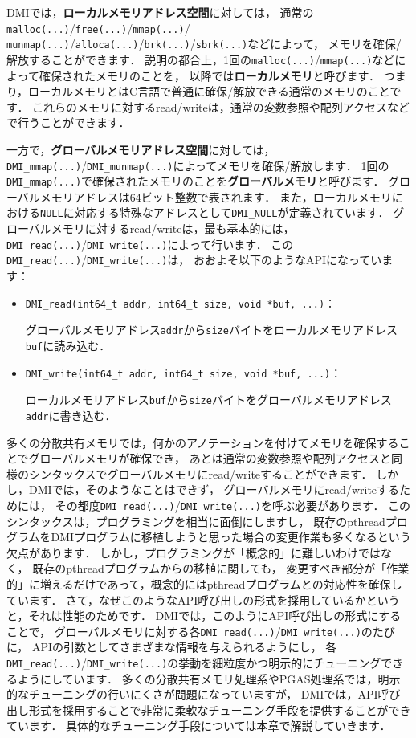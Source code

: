 \documentclass[report,12pt]{jsbook}
\begin{document}
DMIでは，\textbf{ローカルメモリアドレス空間}に対しては，
通常の\texttt{malloc(...)}/\texttt{free(...)}/\texttt{mmap(...)}/
\texttt{munmap(...)}/\texttt{alloca(...)}/\texttt{brk(...)}/\texttt{sbrk(...)}などによって，
メモリを確保/解放することができます．
説明の都合上，1回の\texttt{malloc(...)}/\texttt{mmap(...)}などによって確保されたメモリのことを，
以降では\textbf{ローカルメモリ}と呼びます．
つまり，ローカルメモリとはC言語で普通に確保/解放できる通常のメモリのことです．
これらのメモリに対するread/writeは，通常の変数参照や配列アクセスなどで行うことができます．

一方で，\textbf{グローバルメモリアドレス空間}に対しては，
\texttt{DMI\_mmap(...)}/\texttt{DMI\_munmap(...)}によってメモリを確保/解放します．
1回の\texttt{DMI\_mmap(...)}で確保されたメモリのことを\textbf{グローバルメモリ}と呼びます．
グローバルメモリアドレスは64ビット整数で表されます．
また，ローカルメモリにおける\texttt{NULL}に対応する特殊なアドレスとして\texttt{DMI\_NULL}が定義されています．
グローバルメモリに対するread/writeは，最も基本的には，
\texttt{DMI\_read(...)}/\texttt{DMI\_write(...)}によって行います．
この\texttt{DMI\_read(...)}/\texttt{DMI\_write(...)}は，
おおよそ以下のようなAPIになっています：
\begin{itemize}
\item \texttt{DMI\_read(int64\_t addr, int64\_t size, void *buf, ...)}：
  
  グローバルメモリアドレス\texttt{addr}から\texttt{size}バイトをローカルメモリアドレス\texttt{buf}に読み込む．
\item \texttt{DMI\_write(int64\_t addr, int64\_t size, void *buf, ...)}：
  
  ローカルメモリアドレス\texttt{buf}から\texttt{size}バイトをグローバルメモリアドレス\texttt{addr}に書き込む．
\end{itemize}

多くの分散共有メモリでは，何かのアノテーションを付けてメモリを確保することでグローバルメモリが確保でき，
あとは通常の変数参照や配列アクセスと同様のシンタックスでグローバルメモリにread/writeすることができます．
しかし，DMIでは，そのようなことはできず，
グローバルメモリにread/writeするためには，
その都度\texttt{DMI\_read(...)}/\texttt{DMI\_write(...)}を呼ぶ必要があります．
このシンタックスは，プログラミングを相当に面倒にしますし，
既存のpthreadプログラムをDMIプログラムに移植しようと思った場合の変更作業も多くなるという欠点があります．
しかし，プログラミングが「概念的」に難しいわけではなく，
既存のpthreadプログラムからの移植に関しても，
変更すべき部分が「作業的」に増えるだけであって，概念的にはpthreadプログラムとの対応性を確保しています．
さて，なぜこのようなAPI呼び出しの形式を採用しているかというと，それは性能のためです．
DMIでは，このようにAPI呼び出しの形式にすることで，
グローバルメモリに対する各\texttt{DMI\_read(...)}/\texttt{DMI\_write(...)}のたびに，
APIの引数としてさまざまな情報を与えられるようにし，
各\texttt{DMI\_read(...)}/\texttt{DMI\_write(...)}の挙動を細粒度かつ明示的にチューニングできるようにしています．
多くの分散共有メモリ処理系やPGAS処理系では，明示的なチューニングの行いにくさが問題になっていますが，
DMIでは，API呼び出し形式を採用することで非常に柔軟なチューニング手段を提供することができています．
具体的なチューニング手段については本章で解説していきます．
\end{document}
